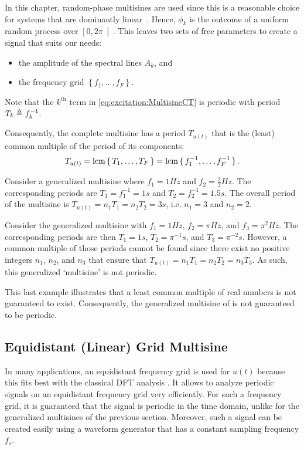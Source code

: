   In this chapter, random-phase multisines are used since this is a reasonable choice for systems that are dominantly linear~\citep{Schoukens2004}.
  Hence, $\phi_k$ is the outcome of a uniform random process over $\left[0,2\pi\right[$.
  This leaves two sets of free parameters to create a signal that suits our needs:
  \begin{itemize}
    \item the amplitude of the spectral lines $A_k$, and
    \item the frequency grid $\left\{f_1, \ldots, f_F \right\}$.
  \end{itemize}
  Note that the $k^{\text{th}}$ term in \eqref{eq:excitation:MultisineCT} is periodic with period $T_k \triangleq f_k^{-1}$.

  Consequently, the complete multisine has a period $T_{u(t)}$ that is the (least) common multiple of the period of its components:
  \begin{equation}
    T_{u(t)}  = \operatorname{lcm} \set{T_1, \ldots, T_F}
      = \operatorname{lcm} \set{f_1^{-1}, \ldots, f_F^{-1}}
    \text{.}
  \end{equation}

  \begin{example}
   Consider a generalized multisine where $f_1 = 1 \unit{Hz}$ and $f_2 = \tfrac{2}{3} \unit{Hz}$.
   The corresponding periods are $T_1 = f_1^{-1} = 1 \unit{s}$ and $T_2 = f_2^{-1} = 1.5 \unit{s}$.
   The overall period of the multisine is $T_{u(t)} = n_1 T_1 = n_2 T_2 = 3 \unit{s}$, i.e. $n_1 = 3$ and $n_2=2$.
  \end{example}

  \begin{example}\label{eg:excitation:non-periodic}
   Consider the generalized multisine with $f_1 = 1 \unit{Hz}$, $f_2 = \pi \unit{Hz}$, and $f_3 = \pi^2 \unit{Hz}$.
   The corresponding periods are then $T_1 = 1 \unit{s}$, $T_2 = \pi^{-1} \unit{s}$, and $T_3 = \pi^{-2} \unit{s}$.
   However, a common multiple of those periods cannot be found since there exist no positive integers $n_1$, $n_2$, and $n_3$ that ensure that $T_{u(t)} = n_1 T_1 = n_2 T_2 = n_3 T_3$.
   As such, this generalized `multisine' is not periodic.
  \end{example}

  This last example illustrates that a least common multiple of real numbers is not guaranteed to exist.
  Consequently, the generalized multisine of  is not guaranteed to be periodic.
  
\subsection{Equidistant (Linear) Grid Multisine}
  In many applications, an equidistant frequency grid is used for $u\left( t\right) $ because this fits best with the classical \gls{DFT} analysis \citep{OppenheimDT,Mandal2007}.
  It allows to analyze periodic signals on an equidistant frequency grid very efficiently.
  For such a frequency grid, it is guaranteed that the signal is periodic in the time domain, unlike for the generalized multisines of the previous section.
  Moreover, such a signal can be created easily using a waveform generator that has a constant sampling frequency $f_s$.
  
